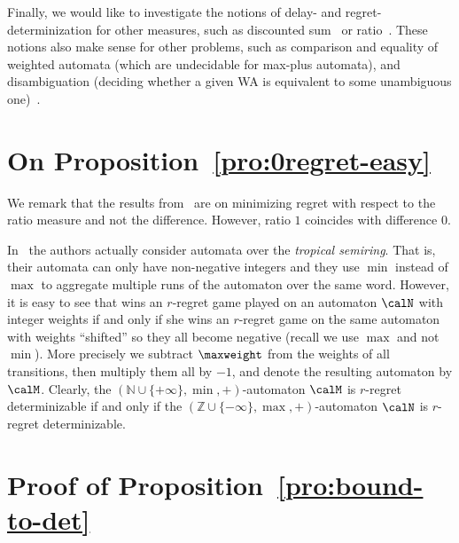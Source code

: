 \documentclass[a4paper]{article}
\begin{document}
Finally, we would like to investigate the notions of delay- and
regret-determinization for other measures, such as discounted sum~\cite{cdh10}
or ratio~\cite{conf/concur/FiliotGR12}. These notions also make sense for other
problems, such as comparison and equality of weighted automata (which are
undecidable for max-plus automata), and disambiguation (deciding whether a given
WA is equivalent to some unambiguous one)~\cite{kirsten_et_al:LIPIcs:2009:1850}. 






\clearpage
\appendix
\section{On Proposition~\ref{pro:0regret-easy}}
We remark that the results from~\cite{akl10} are on minimizing regret with
respect to the ratio measure and not the difference. However, ratio $1$
coincides with difference $0$.

In~\cite{akl10} the authors actually consider automata over the \emph{tropical
semiring}. That is, their automata can only have non-negative integers
and they use $\min$ instead of $\max$ to aggregate multiple runs of the
automaton over the same word. However, it is easy to see that \eve wins an
$r$-regret game played on an automaton $\calN$ with integer weights if and
only if she wins an $r$-regret game on the same automaton with weights
``shifted'' so they all become negative (recall we use $\max$ and not $\min$).
More precisely we subtract $\maxweight$ from the weights of all transitions,
then multiply them all by $-1$, and denote the resulting automaton by $\calM$.
Clearly, the $(\mathbb{N}\cup \{ +\infty \},\min,+)$-automaton $\calM$ is
$r$-regret determinizable if and only if the $(\mathbb{Z}\cup \{ -\infty
\},\max,+)$-automaton $\calN$ is $r$-regret determinizable.

\section{Proof of Proposition~\ref{pro:bound-to-det}}
\end{document}
